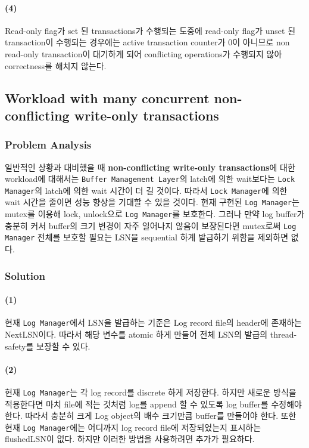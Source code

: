 \documentclass[main.tex]{subfiles}
\begin{document}
\paragraph{(4)}
Read-only flag가 set 된 transactions가 수행되는 도중에 read-only flag가 unset 된 transaction이 수행되는 경우에는 active transaction counter가 0이 아니므로 non read-only transaction이 대기하게 되어 conflicting operations가 수행되지 않아 correctness를 해치지 않는다.


\subsection{Workload with many concurrent non-conflicting write-only transactions}

\subsubsection{Problem Analysis}
일반적인 상황과 대비했을 때 \textbf{non-conflicting write-only transactions}에 대한 workload에 대해서는 \texttt{Buffer Management Layer}의 latch에 의한 wait보다는
\texttt{Lock Manager}의 latch에 의한 wait 시간이 더 길 것이다.
따라서 \texttt{Lock Manager}에 의한 wait 시간을 줄이면 성능 향상을 기대할 수 있을 것이다.
현재 구현된 \texttt{Log Manager}는 mutex를 이용해 lock, unlock으로 \texttt{Log Manager}를 보호한다.
그러나 만약 log buffer가 충분히 커서 buffer의 크기 변경이 자주 일어나지 않음이 보장된다면
mutex로써 \texttt{Log Manager} 전체를 보호할 필요는 LSN을 sequential 하게 발급하기 위함을 제외하면 없다.

\subsubsection{Solution}

\paragraph{(1)}
현재 \texttt{Log Manager}에서 LSN을 발급하는 기준은 Log record file의 header에 존재하는 NextLSN이다. 따라서 해당 변수를 atomic 하게 만들어 전체 LSN의 발급의 thread-safety를 보장할 수 있다.

\paragraph{(2)}
현재 \texttt{Log Manager}는 각 log record를 discrete 하게 저장한다. 하지만 새로운 방식을 적용한다면 마치 file에 적는 것처럼 log를 append 할 수 있도록 log buffer를 수정해야 한다.
따라서 충분히 크게 Log object의 배수 크기만큼 buffer를 만들어야 한다.
또한 현재 \texttt{Log Manager}에는 어디까지 log record file에 저장되었는지 표시하는 flushedLSN이 없다. 하지만 이러한 방법을 사용하려면 추가가 필요하다.
\end{document}
